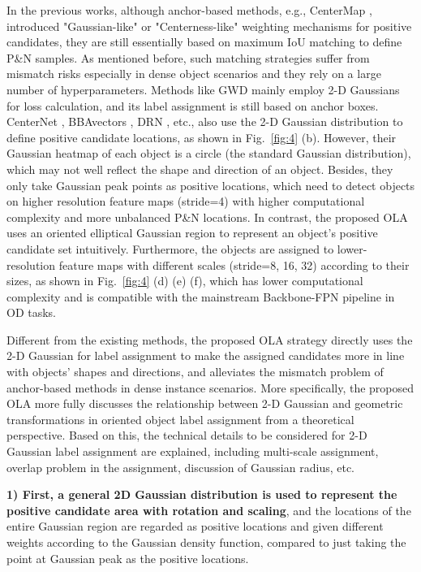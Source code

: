 In the previous works, although anchor-based methods, e.g., CenterMap \cite{wang2020learning}, introduced "Gaussian-like" or "Centerness-like" \cite{tian2019fcos} weighting mechanisms for positive candidates, they are still essentially based on maximum IoU matching to define P\&N samples. As mentioned before, such matching strategies suffer from mismatch risks especially in dense object scenarios and they rely on a large number of hyperparameters. Methods like GWD \cite{yang2021rethinking} mainly employ 2-D Gaussians for loss calculation, and its label assignment is still based on anchor boxes. CenterNet \cite{zhou2019objects}, BBAvectors \cite{yi2020oriented}, DRN \cite{pan2020dynamic}, etc., also use the 2-D Gaussian distribution to define positive candidate locations, as shown in Fig.~\ref{fig:4} (b). However, their Gaussian heatmap of each object is a circle (the standard Gaussian distribution), which may not well reflect the shape and direction of an object. Besides, they only take Gaussian peak points as positive locations, which need to detect objects on higher resolution feature maps (stride=4) with higher computational complexity and more unbalanced P\&N locations. In contrast, the proposed OLA uses an oriented elliptical Gaussian region to represent an object's positive candidate set intuitively. Furthermore, the objects are assigned to lower-resolution feature maps with different scales (stride=8, 16, 32) according to their sizes, as shown in Fig.~\ref{fig:4} (d) (e) (f), which has lower computational complexity and is compatible with the mainstream Backbone-FPN \cite{linFeaturePyramidNetworks2017a,redmonYOLOv3IncrementalImprovement2018} pipeline in OD tasks. 

Different from the existing methods, the proposed OLA strategy directly uses the 2-D Gaussian for label assignment to make the assigned candidates more in line with objects’ shapes and directions, and alleviates the mismatch problem of anchor-based methods in dense instance scenarios. More specifically, the proposed OLA more fully discusses the relationship between 2-D Gaussian and geometric transformations in oriented object label assignment from a theoretical perspective. Based on this, the technical details to be considered for 2-D Gaussian label assignment are explained, including multi-scale assignment, overlap problem in the assignment, discussion of Gaussian radius, etc.

\textbf{1) First, a general 2D Gaussian distribution is used to represent the positive candidate area with rotation and scaling}, and the locations of the entire Gaussian region are regarded as positive locations and given different weights according to the Gaussian density function, compared to just taking the point at Gaussian peak as the positive locations.

